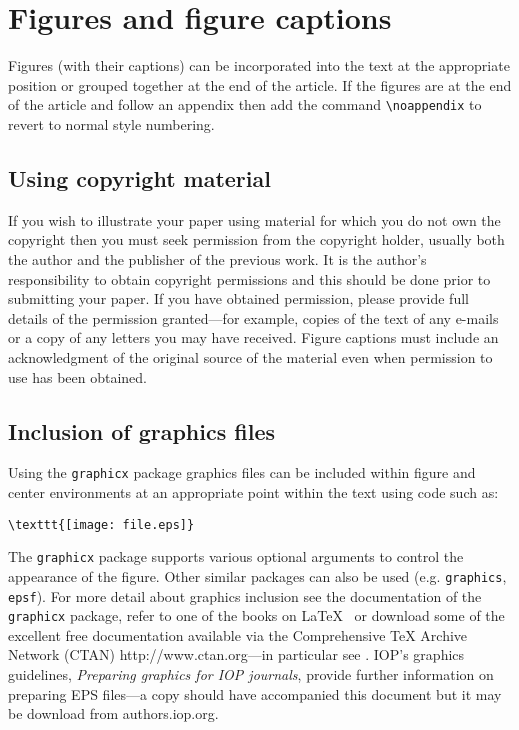 \documentclass[12pt]{iopart}
\newcommand{\gguide}{{\it Preparing graphics for IOP journals}}
\begin{document}
\section{Figures and figure captions}

Figures (with their captions) can be incorporated into the text at the appropriate position or grouped together
at the end of the article. If the figures are at the end of the article and follow an appendix then add the command \verb"\noappendix" to revert to normal style numbering.

\subsection{Using copyright material}
If you wish to illustrate your paper using material for which you 
do not own the copyright then you must seek permission from 
the copyright holder, usually both the author and the publisher of the previous work. It is the author's responsibility to obtain 
copyright permissions and this should be done
prior to submitting your paper. 
If you have obtained permission, please provide full details of 
the permission granted---for example, copies of the text of any e-mails 
or a copy of any letters you may have received. Figure captions must include an acknowledgment of the original source of the material even when permission to use has been obtained.

\subsection{Inclusion of graphics files\label{figinc}}
Using the \verb"graphicx" package graphics files can 
be included within figure and center environments at an 
appropriate point within the text using code such as:
\small\begin{verbatim}
\texttt{[image: file.eps]}
\end{verbatim}\normalsize
The \verb"graphicx" package supports various optional arguments
to control the appearance of the figure. Other similar 
packages can also be used (e.g. \verb"graphics", \verb"epsf"). 
For more detail about graphics inclusion see the documentation 
of the \verb"graphicx" package, refer to one of the books on \LaTeX\ {\cite{book1}}
or download some of the excellent free documentation available via the Comprehensive
TeX Archive Network (CTAN) http://www.ctan.org---{in particular see \cite{eps}}.
IOP's graphics guidelines, \gguide, provide further information on preparing EPS files---a copy
should have accompanied this document but it may be download from authors.iop.org.
\end{document}
